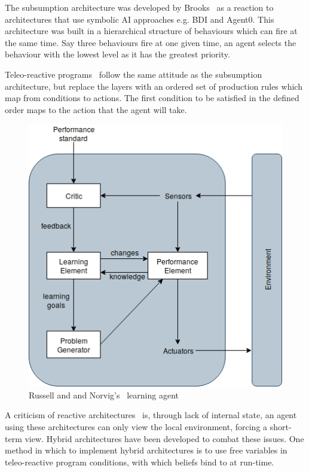 \documentclass[]{final_report}
\begin{document}
The subsumption architecture was developed by Brooks~\cite{brooks1991intelligence} as a reaction to architectures that use symbolic AI approaches e.g. BDI and Agent0. This architecture was built in a hierarchical structure of behaviours which can fire at the same time. Say three behaviours fire at one given time, an agent selects the behaviour with the lowest level as it has the greatest priority.\par 
Teleo-reactive programs~\cite{nilsson1993teleo} follow the same attitude as the subsumption architecture, but replace the layers with an ordered set of production rules which map from conditions to actions. The first condition to be satisfied in the defined order maps to the action that the agent will take.\par 
\begin{figure}
\vspace{-20pt}
\begin{framed}
	\center
	\includegraphics[width=\textwidth]{LearningAgent.png}
	\caption{Russell and and Norvig's~\cite{russell2016artificial} learning agent}
	\label{fig:learning}
\end{framed}
\vspace{-30pt}
\end{figure}
A criticism of reactive architectures~\cite{wooldridge2009introduction} is, through lack of internal state, an agent using these architectures can only view the local environment, forcing a short-term view. Hybrid architectures have been developed to combat these issues. One method in which to implement hybrid architectures is to use free variables in teleo-reactive program conditions, with which beliefs bind to at run-time.\par 
\end{document}
